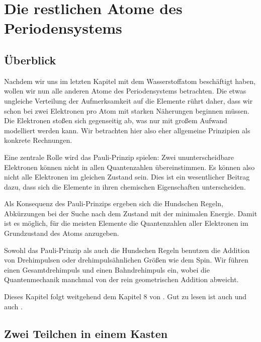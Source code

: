 \renewcommand{\lastmod}{19. November 2024}
\renewcommand{\chapterauthors}{Markus Lippitz}

\chapter{Die restlichen Atome des Periodensystems}



\section{Überblick}

Nachdem wir uns im letzten Kapitel mit dem Wasserstoffatom beschäftigt haben, wollen wir nun alle anderen Atome des Periodensystems betrachten. Die etwas ungleiche Verteilung der Aufmerksamkeit auf die Elemente rührt daher, dass wir schon bei zwei Elektronen pro Atom mit starken Näherungen beginnen müssen. Die Elektronen stoßen sich gegenseitig ab, was nur mit großem Aufwand modelliert werden kann. Wir betrachten hier also eher allgemeine Prinzipien als konkrete Rechnungen.

Eine zentrale Rolle wird das Pauli-Prinzip spielen: Zwei ununterscheidbare Elektronen können nicht in allen Quantenzahlen übereinstimmen. Es können also nicht alle Elektronen im gleichen Zustand sein. Dies ist ein wesentlicher Beitrag dazu, dass sich die Elemente in ihren chemischen Eigenschaften unterscheiden.

Als Konsequenz des Pauli-Prinzips ergeben sich die Hundschen Regeln, Abkürzungen bei der Suche nach dem Zustand mit der minimalen Energie. Damit ist es möglich, für die meisten Elemente die Quantenzahlen aller Elektronen im Grundzustand des Atoms anzugeben.

Sowohl das Pauli-Prinzip als auch die Hundschen Regeln benutzen die Addition von Drehimpulsen oder drehimpulsähnlichen Größen wie dem Spin. Wir führen einen Gesamtdrehimpuls und einen Bahndrehimpuls ein, wobei die Quantenmechanik manchmal von der rein geometrischen Addition abweicht.

Dieses Kapitel folgt weitgehend dem Kapitel 8 von \cite{Harris_moderne_Physik}. Gut zu lesen ist auch \cite{Demtröder_ep3} und auch \cite{Heintze_WTA}.

\section{Zwei Teilchen in einem Kasten}

